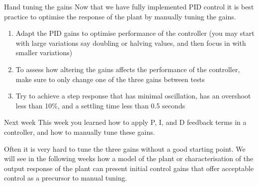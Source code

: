 \documentclass[9pt]{beamer-control}
\begin{document}

\begin{frame}{Hand tuning the gains}
Now that we have fully implemented PID control it is best practice to optimise the response of the plant by manually tuning the gains. 

\begin{enumerate}
	\item Adapt the PID gains to optimise performance of the controller (you may start with large variations say doubling or halving values, and then focus in with smaller variations)
	\item To assess how altering the gains affects the performance of the controller, make sure to only change one of the three gains between tests
	\item Try to achieve a step response that has minimal oscillation, has an overshoot less than 10\%, and a settling time less than 0.5 seconds
\end{enumerate}

\end{frame}

\begin{frame}{Next week}
This week you learned how to apply P, I, and D feedback terms in a controller, and how to manually tune these gains.

Often it is very hard to tune the three gains without a good starting point. We will see in the following weeks how a model of the plant or characterisation of the output response of the plant can present initial control gains that offer acceptable control as a precursor to manual tuning. 
\end{frame}
\end{document}
